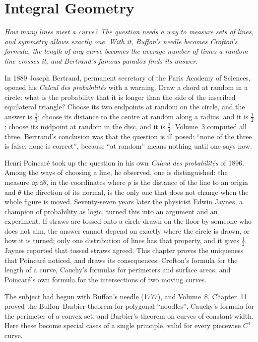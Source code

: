 \chapter{Integral Geometry}

\begin{center}\itshape
How many lines meet a curve? The question needs a way to measure sets of lines, and symmetry allows exactly one. With it, Buffon's needle becomes
Crofton's formula, the length of any curve becomes the average number of times a random line crosses it, and Bertrand's famous paradox finds its answer.
\end{center}

In 1889 Joseph Bertrand, permanent secretary of the Paris Academy of Sciences, opened his \emph{Calcul des probabilités} with a warning. Draw a chord at random
in a circle: what is the probability that it is longer than the side of the inscribed equilateral triangle? Choose its two endpoints at random on the circle,
and the answer is $\frac13$; choose its distance to the centre at random along a radius, and it is $\frac12$; choose its midpoint at random in the disc, and it is
$\frac14$. Volume~3 computed all three. Bertrand's conclusion was that the question is ill posed: ``none of the three is false, none is correct'', because ``at random''
means nothing until one says how.

Henri Poincaré took up the question in his own \emph{Calcul des probabilités} of 1896. Among the ways of choosing a line, he observed, one is distinguished: the measure
$\dd p\,\dd\theta$, in the coordinates where $p$ is the distance of the line to an origin and $\theta$ the direction of its normal, is the only one that does not change
when the whole figure is moved. Seventy-seven years later the physicist Edwin Jaynes, a champion of probability as logic, turned this into an argument and an experiment.
If straws are tossed onto a circle drawn on the floor by someone who does not aim, the answer cannot depend on exactly where the circle is drawn, or how it is turned;
only one distribution of lines has that property, and it gives $\frac12$. Jaynes reported that tossed straws agreed. This chapter proves the uniqueness that
Poincaré noticed, and draws its consequences: Crofton's formula for the length of a curve, Cauchy's formulas for perimeters and surface areas, and Poincaré's own
formula for the intersections of two moving curves.

The subject had begun with Buffon's needle (1777), and Volume~8, Chapter~11 proved the Buffon--Barbier theorem for polygonal ``noodles'', Cauchy's formula for the
perimeter of a convex set, and Barbier's theorem on curves of constant width. Here these become special cases of a single principle, valid for every piecewise $C^1$ curve.

